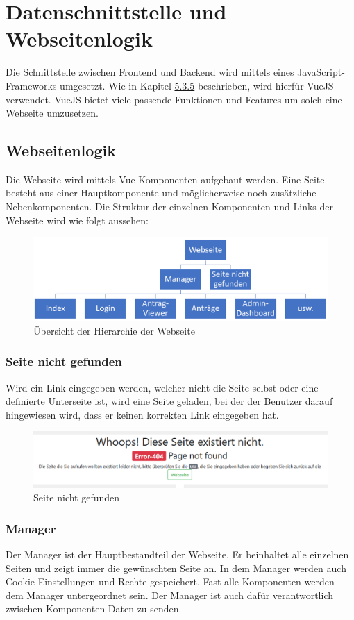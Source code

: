 \section{Datenschnittstelle und Webseitenlogik}
Die Schnittstelle zwischen Frontend und Backend wird mittels eines JavaScript-Frameworks umgesetzt. Wie in Kapitel \hyperref[sec:rfoster_fazit]{5.3.5} beschrieben, wird hierfür VueJS verwendet. VueJS bietet viele passende Funktionen und Features um solch eine Webseite umzusetzen.
\subsection{Webseitenlogik}
\label{sec:webseitenlogik}
Die Webseite wird mittels Vue-Komponenten aufgebaut werden. Eine Seite besteht aus einer Hauptkomponente und möglicherweise noch zusätzliche Nebenkomponenten. Die Struktur der einzelnen Komponenten und Links der Webseite wird wie folgt aussehen:
\begin{figure}[H]
	\centering
	\includegraphics[width=0.8\linewidth]{images/Webseite_hierarchie}
	\caption[Hierarchie der Webseite]{Übersicht der Hierarchie der Webseite}
	\label{fig:webseitehierachie}
\end{figure}

\subsubsection{Seite nicht gefunden}
Wird ein Link eingegeben werden, welcher nicht die Seite selbst oder eine definierte Unterseite ist, wird eine Seite geladen, bei der der Benutzer darauf hingewiesen wird, dass er keinen korrekten Link eingegeben hat.
\begin{figure}[H]
	\centering
	\includegraphics[width=0.6\linewidth]{images/page_not_found}
	\caption[Seite nicht gefunden]{Seite nicht gefunden}
	\label{fig:pagenotfound}
\end{figure}

\subsubsection{Manager}
Der Manager ist der Hauptbestandteil der Webseite. Er beinhaltet alle einzelnen Seiten und zeigt immer die gewünschten Seite an. In dem Manager werden auch Cookie-Einstellungen und Rechte gespeichert. Fast alle Komponenten werden dem Manager untergeordnet sein. Der Manager ist auch dafür verantwortlich zwischen Komponenten Daten zu senden.

